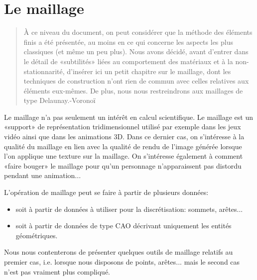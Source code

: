 \chapter{Le maillage}\label{Ch-mesh}
\begin{abstract}
À ce niveau du document, on peut considérer que la méthode des éléments finis a été présentée, au moins en ce qui concerne les aspects les plus classiques (et même un peu plus).
Nous avons décidé, avant d'entrer dans le détail de «subtilités» liées au comportement des matériaux et à la non-stationnarité, d'insérer ici un petit chapitre sur le maillage, dont les techniques de construction n'ont rien de commun avec celles relatives aux éléments eux-mêmes.
De plus, nous nous restreindrons aux maillages de type Delaunay.-Voronoï
\end{abstract}

Le maillage n'a pas seulement un intérêt en calcul scientifique. Le maillage est un «support» de représentation tridimensionnel utilisé par exemple dans les jeux vidéo ainsi que dans les animations 3D. Dans ce dernier cas, on s'intéresse à la qualité du maillage en lien avec la qualité de rendu de l'image générée lorsque l'on applique une texture sur la maillage. On s'intéresse également à comment «faire bouger» le maillage pour qu'un personnage n'apparaissent pas distordu pendant une animation...

\medskip
L'opération de maillage peut se faire à partir de plusieurs données:
\begin{itemize}
   \item soit à partir de données à utiliser pour la discrétisation: sommets, arêtes...
   \item soit à partir de données de type CAO décrivant uniquement les entités géométriques.
\end{itemize}
Nous nous contenterons de présenter quelques outils de maillage relatifs au premier cas, i.e. lorsque nous disposons de points, arêtes... mais le second cas n'est pas vraiment plus compliqué.


